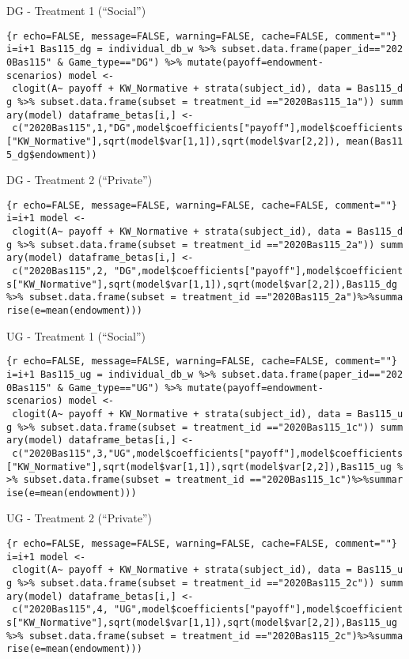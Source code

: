 DG - Treatment 1 (``Social'')

\texttt{\{r\ echo=FALSE,\ message=FALSE,\ warning=FALSE,\ cache=FALSE,\ comment=""\}\ i=i+1\ Bas115\_dg\ =\ individual\_db\_w\ \%\textgreater{}\%\ subset.data.frame(paper\_id=="2020Bas115"\ \&\ Game\_type=="DG")\ \%\textgreater{}\%\ mutate(payoff=endowment-scenarios)\ model\ \textless{}-\ clogit(A\textasciitilde{}\ payoff\ +\ KW\_Normative\ +\ strata(subject\_id),\ data\ =\ Bas115\_dg\ \%\textgreater{}\%\ subset.data.frame(subset\ =\ treatment\_id\ =="2020Bas115\_1a"))\ summary(model)\ dataframe\_betas{[}i,{]}\ \textless{}-\ c("2020Bas115",1,"DG",model\$coefficients{[}"payoff"{]},model\$coefficients{[}"KW\_Normative"{]},sqrt(model\$var{[}1,1{]}),sqrt(model\$var{[}2,2{]}),\ mean(Bas115\_dg\$endowment))}

DG - Treatment 2 (``Private'')

\texttt{\{r\ echo=FALSE,\ message=FALSE,\ warning=FALSE,\ cache=FALSE,\ comment=""\}\ i=i+1\ model\ \textless{}-\ clogit(A\textasciitilde{}\ payoff\ +\ KW\_Normative\ +\ strata(subject\_id),\ data\ =\ Bas115\_dg\ \%\textgreater{}\%\ subset.data.frame(subset\ =\ treatment\_id\ =="2020Bas115\_2a"))\ summary(model)\ dataframe\_betas{[}i,{]}\ \textless{}-\ c("2020Bas115",2,\ "DG",model\$coefficients{[}"payoff"{]},model\$coefficients{[}"KW\_Normative"{]},sqrt(model\$var{[}1,1{]}),sqrt(model\$var{[}2,2{]}),Bas115\_dg\ \%\textgreater{}\%\ subset.data.frame(subset\ =\ treatment\_id\ =="2020Bas115\_2a")\%\textgreater{}\%summarise(e=mean(endowment)))}

UG - Treatment 1 (``Social'')

\texttt{\{r\ echo=FALSE,\ message=FALSE,\ warning=FALSE,\ cache=FALSE,\ comment=""\}\ i=i+1\ Bas115\_ug\ =\ individual\_db\_w\ \%\textgreater{}\%\ subset.data.frame(paper\_id=="2020Bas115"\ \&\ Game\_type=="UG")\ \%\textgreater{}\%\ mutate(payoff=endowment-scenarios)\ model\ \textless{}-\ clogit(A\textasciitilde{}\ payoff\ +\ KW\_Normative\ +\ strata(subject\_id),\ data\ =\ Bas115\_ug\ \%\textgreater{}\%\ subset.data.frame(subset\ =\ treatment\_id\ =="2020Bas115\_1c"))\ summary(model)\ dataframe\_betas{[}i,{]}\ \textless{}-\ c("2020Bas115",3,"UG",model\$coefficients{[}"payoff"{]},model\$coefficients{[}"KW\_Normative"{]},sqrt(model\$var{[}1,1{]}),sqrt(model\$var{[}2,2{]}),Bas115\_ug\ \%\textgreater{}\%\ subset.data.frame(subset\ =\ treatment\_id\ =="2020Bas115\_1c")\%\textgreater{}\%summarise(e=mean(endowment)))}

UG - Treatment 2 (``Private'')

\texttt{\{r\ echo=FALSE,\ message=FALSE,\ warning=FALSE,\ cache=FALSE,\ comment=""\}\ i=i+1\ model\ \textless{}-\ clogit(A\textasciitilde{}\ payoff\ +\ KW\_Normative\ +\ strata(subject\_id),\ data\ =\ Bas115\_ug\ \%\textgreater{}\%\ subset.data.frame(subset\ =\ treatment\_id\ =="2020Bas115\_2c"))\ summary(model)\ dataframe\_betas{[}i,{]}\ \textless{}-\ c("2020Bas115",4,\ "UG",model\$coefficients{[}"payoff"{]},model\$coefficients{[}"KW\_Normative"{]},sqrt(model\$var{[}1,1{]}),sqrt(model\$var{[}2,2{]}),Bas115\_ug\ \%\textgreater{}\%\ subset.data.frame(subset\ =\ treatment\_id\ =="2020Bas115\_2c")\%\textgreater{}\%summarise(e=mean(endowment)))}

